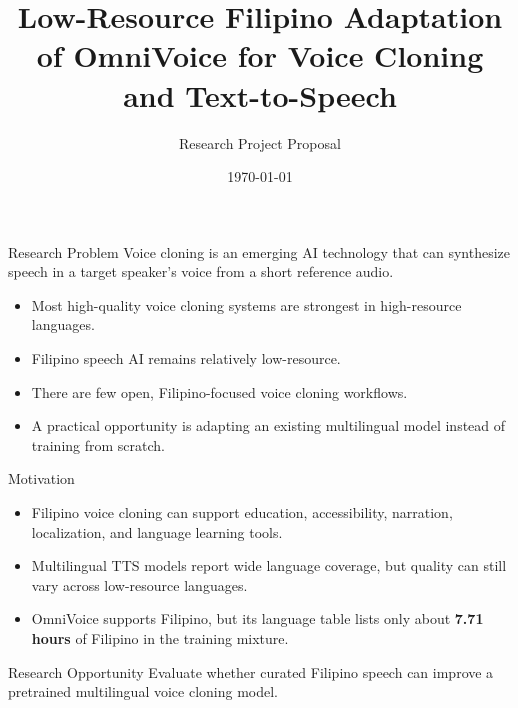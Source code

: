 \documentclass[aspectratio=169]{beamer}
\title[Filipino OmniVoice Fine-Tuning]{Low-Resource Filipino Adaptation of OmniVoice for Voice Cloning and Text-to-Speech}
\subtitle{Research Project Proposal}
\author{}
\institute{Current Trends}
\date{\today}
\begin{document}
\maketitle

\begin{frame}{Research Problem}
  Voice cloning is an emerging AI technology that can synthesize speech in a target speaker's voice from a short reference audio.

  \vspace{0.6em}

  \begin{itemize}
    \item Most high-quality voice cloning systems are strongest in high-resource languages.
    \item Filipino speech AI remains relatively low-resource.
    \item There are few open, Filipino-focused voice cloning workflows.
    \item A practical opportunity is adapting an existing multilingual model instead of training from scratch.
  \end{itemize}
\end{frame}

\begin{frame}{Motivation}
  \begin{itemize}
    \item Filipino voice cloning can support education, accessibility, narration, localization, and language learning tools.
    \item Multilingual TTS models report wide language coverage, but quality can still vary across low-resource languages.
    \item OmniVoice supports Filipino, but its language table lists only about \textbf{7.71 hours} of Filipino in the training mixture.
  \end{itemize}

  \vspace{0.7em}

  \begin{block}{Research Opportunity}
    Evaluate whether curated Filipino speech can improve a pretrained multilingual voice cloning model.
  \end{block}
\end{frame}
\end{document}
